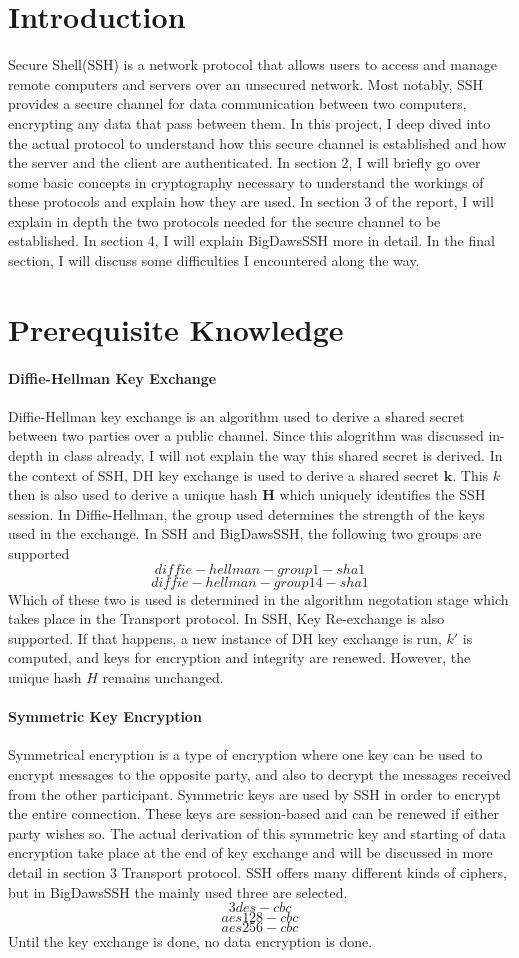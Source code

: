 \documentclass[10pt,sigconf]{acmart}
\begin{document}
\section{Introduction}
Secure Shell(SSH) is a network protocol that allows users to access and manage remote computers and servers over an unsecured network. Most notably, SSH provides a secure channel for data communication between two computers, encrypting any data that pass between them. In this project, I deep dived into the actual protocol to understand how this secure channel is established and how the server and the client are authenticated. In section 2, I will briefly go over some basic concepts in cryptography necessary to understand the workings of these protocols and explain how they are used. In section 3 of the report, I will explain in depth the two protocols needed for the secure channel to be established. In section 4, I will explain BigDawsSSH more in detail. In the final section, I will discuss some difficulties I encountered along the way.

\section{Prerequisite Knowledge}
\paragraph{\textbf{Diffie-Hellman Key Exchange}} Diffie-Hellman key exchange is an algorithm used to derive a shared secret between two parties over a public channel. Since this alogrithm was discussed in-depth in class already, I will not explain the way this shared secret is derived. In the context of SSH, DH key exchange is used to derive a shared secret $\mathbf{k}$. This $k$ then is also used to derive a unique hash $\mathbf{H}$ which uniquely identifies the SSH session. In Diffie-Hellman, the group used determines the strength of the keys used in the exchange. In SSH and BigDawsSSH, the following two groups are supported \[
  diffie-hellman-group1-sha1  
\]
\[
  diffie-hellman-group14-sha1  
\]
Which of these two is used is determined in the algorithm negotation stage which takes place in the Transport protocol. In SSH, Key Re-exchange is also supported. If that happens, a new instance of DH key exchange is run, $k'$ is computed, and keys for encryption and integrity are renewed. However, the unique hash $H$ remains unchanged.
\paragraph{\textbf{Symmetric Key Encryption}} Symmetrical encryption is a type of encryption where one key can be used to encrypt messages to the opposite party, and also to decrypt the messages received from the other participant. Symmetric keys are used by SSH in order to encrypt the entire connection. These keys are session-based and can be renewed if either party wishes so. The actual derivation of this symmetric key and starting of data encryption take place at the end of key exchange and will be discussed in more detail in section 3 Transport protocol. SSH offers many different kinds of ciphers, but in BigDawsSSH the mainly used three are selected. \[3des-cbc\]\[aes128-cbc\]\[aes256-cbc\]
Until the key exchange is done, no data encryption is done. 
\end{document}

